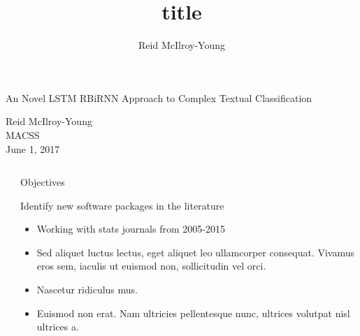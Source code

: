 \documentclass[final]{beamer}
\title{title} %
\author{Reid McIlroy-Young} %
\institute{MACSS} %
\newlength{\sepwid}
\newlength{\onecolwid}
\begin{document}
	
	
	\setlength{\belowcaptionskip}{2ex} %
	\setlength\belowdisplayshortskip{2ex} %
	
	\begin{frame}[t] %
	
	\begin{block}{\centering \Huge {An Novel LSTM RBiRNN Approach to Complex Textual Classification}}
		\begin{center}
			\Large{
				Reid McIlroy-Young \\
				MACSS\\
				June 1, 2017}
		\end{center}
	\end{block}
	
	\begin{columns}[t] %
		
		\begin{column}{\sepwid}\end{column} %
		
		\begin{column}{\onecolwid} %
			
			
			\begin{alertblock}{Objectives}
				
				Identify new software packages in the literature
				\begin{itemize}
					\item Working with stats journals from 2005-2015
					\item Sed aliquet luctus lectus, eget aliquet leo ullamcorper consequat. Vivamus eros sem, iaculis ut euismod non, sollicitudin vel orci.
					\item Nascetur ridiculus mus.  
					\item Euismod non erat. Nam ultricies pellentesque nunc, ultrices volutpat nisl ultrices a.
				\end{itemize}
				

\end{alertblock}
\end{column}
\end{columns}
\end{frame}
\end{document}
